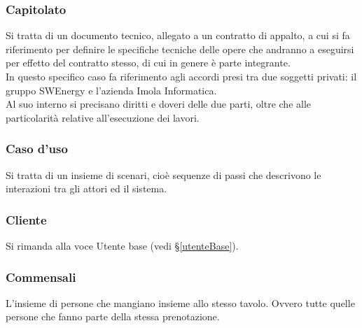 
\subsubsection*{Capitolato}
Si tratta di un documento tecnico, allegato a un contratto di appalto, a cui si
fa riferimento per definire le specifiche tecniche delle opere che andranno a
eseguirsi per effetto del contratto stesso, di cui in genere è parte integrante.\\
In questo specifico caso fa riferimento agli accordi presi tra due soggetti
privati: il gruppo SWEnergy e l'azienda Imola Informatica. \\
Al suo interno si precisano diritti e doveri delle due parti, oltre che alle
particolarità relative all'esecuzione dei lavori.

\subsubsection*{Caso d'uso}
Si tratta di un insieme di scenari, cioè sequenze di passi che descrivono le
interazioni tra gli attori ed il sistema.

\subsubsection*{Cliente} 
Si rimanda alla voce Utente base (vedi \S\ref{utenteBase}).

\subsubsection*{Commensali} 
L'insieme di persone che mangiano insieme allo stesso tavolo. Ovvero tutte quelle persone che fanno parte della stessa prenotazione.

\newpage


